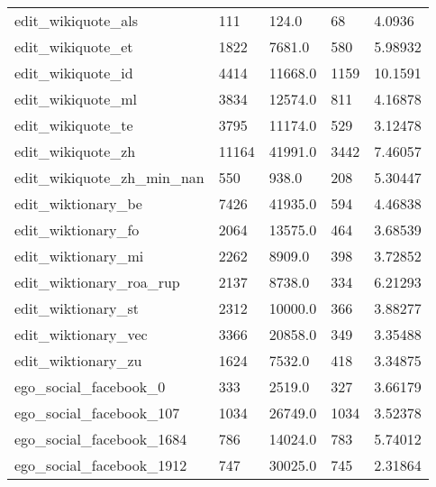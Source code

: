 \begin{longtable}{lllll}
 edit\_wikiquote\_als                                 & 111        & 124.0       & 68    & 4.0936     \\
 edit\_wikiquote\_et                                  & 1822       & 7681.0      & 580   & 5.98932    \\
 edit\_wikiquote\_id                                  & 4414       & 11668.0     & 1159  & 10.1591    \\
 edit\_wikiquote\_ml                                  & 3834       & 12574.0     & 811   & 4.16878    \\
 edit\_wikiquote\_te                                  & 3795       & 11174.0     & 529   & 3.12478    \\
 edit\_wikiquote\_zh                                  & 11164      & 41991.0     & 3442  & 7.46057    \\
 edit\_wikiquote\_zh\_min\_nan                          & 550        & 938.0       & 208   & 5.30447    \\
 edit\_wiktionary\_be                                 & 7426       & 41935.0     & 594   & 4.46838    \\
 edit\_wiktionary\_fo                                 & 2064       & 13575.0     & 464   & 3.68539    \\
 edit\_wiktionary\_mi                                 & 2262       & 8909.0      & 398   & 3.72852    \\
 edit\_wiktionary\_roa\_rup                            & 2137       & 8738.0      & 334   & 6.21293    \\
 edit\_wiktionary\_st                                 & 2312       & 10000.0     & 366   & 3.88277    \\
 edit\_wiktionary\_vec                                & 3366       & 20858.0     & 349   & 3.35488    \\
 edit\_wiktionary\_zu                                 & 1624       & 7532.0      & 418   & 3.34875    \\
 ego\_social\_facebook\_0                              & 333        & 2519.0      & 327   & 3.66179    \\
 ego\_social\_facebook\_107                            & 1034       & 26749.0     & 1034  & 3.52378    \\
 ego\_social\_facebook\_1684                           & 786        & 14024.0     & 783   & 5.74012    \\
 ego\_social\_facebook\_1912                           & 747        & 30025.0     & 745   & 2.31864    \\

\end{longtable}
